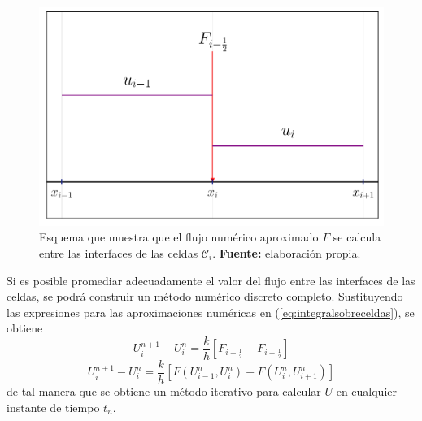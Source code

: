 \begin{figure}[ht]
	\centering
	\includegraphics[width=0.9\linewidth]{../some_plots/cap2/graficas/numeric_Flux.pdf}
	\caption{Esquema que muestra que el flujo numérico aproximado $F$ se calcula entre las interfaces de las celdas $\mathcal{C}_i$. \textbf{Fuente:} elaboración propia.}
	\label{fig:flujo-sobre-la-grilla}
\end{figure}

Si es posible promediar adecuadamente el valor del flujo entre las interfaces de las celdas, se podrá construir un método numérico discreto completo. Sustituyendo las expresiones para las aproximaciones numéricas en (\ref{eq:integralsobreceldas}), se obtiene
\begin{equation}
	U_{i}^{n+1}-U_{i}^{n} = 
	\frac{k}{h}\left[ F_{i-\frac{1}{2}} - F_{i+\frac{1}{2}} \right]
	\label{eq:metodo-vol-finitos}
\end{equation}
\begin{equation}
	U_{i}^{n+1}-U_{i}^{n} = 
	\frac{k}{h}\left[ F(U_{i-1}^n, U_i^n) - F(U_{i}^n, U_{i+1}^n) \right]
	\label{eq:metodo-vol-finitos-2}
\end{equation}
de tal manera que se obtiene un método iterativo para calcular $U$ en cualquier instante de tiempo $t_n$.

